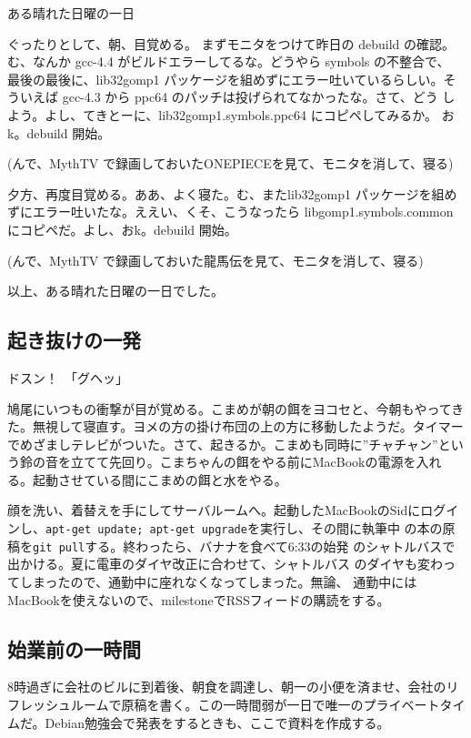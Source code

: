 \documentclass[mingoth,a4paper]{jsarticle}
\begin{document}
 ある晴れた日曜の一日

 ぐったりとして、朝、目覚める。 まずモニタをつけて昨日の debuild の確認。
 む、なんか gcc-4.4 がビルドエラーしてるな。どうやら symbols の不整合で、
 最後の最後に、lib32gomp1 パッケージを組めずにエラー吐いているらしい。そ
 ういえば gcc-4.3 から ppc64 のパッチは投げられてなかったな。さて、どう
 しよう。よし、てきとーに、lib32gomp1.symbols.ppc64 にコピペしてみるか。
 おk。debuild 開始。

 (んで、MythTV で録画しておいたONEPIECEを見て、モニタを消して、寝る)

 夕方、再度目覚める。ああ、よく寝た。む、またlib32gomp1 パッケージを組め
 ずにエラー吐いたな。ええい、くそ、こうなったら libgomp1.symbols.common
 にコピペだ。よし、おk。debuild 開始。

 (んで、MythTV で録画しておいた龍馬伝を見て、モニタを消して、寝る)

 以上、ある晴れた日曜の一日でした。


 \subsection{起き抜けの一発}
 ドスン！　「グヘッ」

 鳩尾にいつもの衝撃が目が覚める。こまめが朝の餌をヨコセと、今朝もやってき
 た。無視して寝直す。ヨメの方の掛け布団の上の方に移動したようだ。タイマーでめざましテレビがついた。さて、起きるか。こまめも同時に''チャチャン''という鈴の音を立てて先回り。こまちゃんの餌をやる前にMacBookの電源を入れる。起動させている間にこまめの餌と水をやる。

 顔を洗い、着替えを手にしてサーバルームへ。起動したMacBookのSidにログイ
 ンし、\texttt{apt-get update; apt-get upgrade}を実行し、その間に執筆中
 の本の原稿を\texttt{git pull}する。終わったら、バナナを食べて6:33の始発
 のシャトルバスで出かける。夏に電車のダイヤ改正に合わせて、シャトルバス
 のダイヤも変わってしまったので、通勤中に座れなくなってしまった。無論、
 通勤中にはMacBookを使えないので、milestoneでRSSフィードの購読をする。

\subsection{始業前の一時間}
8時過ぎに会社のビルに到着後、朝食を調達し、朝一の小便を済ませ、会社のリ
フレッシュルームで原稿を書く。この一時間弱が一日で唯一のプライベートタイ
ムだ。Debian勉強会で発表をするときも、ここで資料を作成する。
\end{document}
